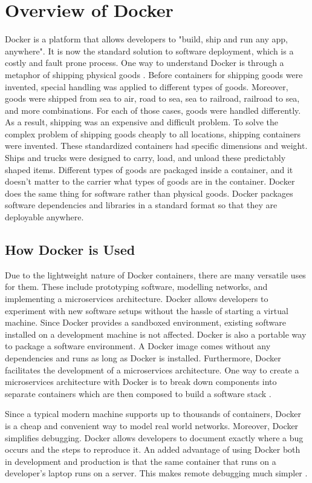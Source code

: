 \documentclass[11pt]{article}
\begin{document}
\section{Overview of Docker}

Docker is a platform that allows developers to "build, ship and run any app, anywhere". It is now the standard solution to software deployment, which is a costly and fault prone process. One way to understand Docker is through a metaphor of shipping physical goods \cite{miell}. Before containers for shipping goods were invented, special handling was applied to different types of goods. Moreover, goods were shipped from sea to air, road to sea, sea to railroad, railroad to sea, and more combinations. For each of those cases, goods were handled differently. As a result, shipping was an expensive and difficult problem. To solve the complex problem of shipping goods cheaply to all locations, shipping containers were invented. These standardized containers had specific dimensions and weight. Ships and trucks were designed to carry, load, and unload these predictably shaped items. Different types of goods are packaged inside a container, and it doesn’t matter to the carrier what types of goods are in the container. Docker does the same thing for software rather than physical goods. Docker packages software dependencies and libraries in a standard format so that they are deployable anywhere. 

\subsection{How Docker is Used}
Due to the lightweight nature of Docker containers, there are many versatile uses for them. These include prototyping software, modelling networks, and implementing a microservices architecture. Docker allows developers to experiment with new software setups without the hassle of starting a virtual machine. Since Docker provides a sandboxed environment, existing software installed on a development machine is not affected. Docker is also a portable way to package a software environment. A Docker image comes without any dependencies and runs as long as Docker is installed. Furthermore, Docker facilitates the development of a microservices architecture. One way to create a microservices architecture with Docker is to break down components into separate containers which are then composed to build a software stack \cite{miell}. 

Since a typical modern machine supports up to thousands of containers, Docker is a cheap and convenient way to model real world networks. Moreover, Docker simplifies debugging. Docker allows developers to document exactly where a bug occurs and the steps to reproduce it. An added advantage of using Docker both in development and production is that the same container that runs on a developer’s laptop runs on a server. This makes remote debugging much simpler \cite{miell}. 
\end{document}
